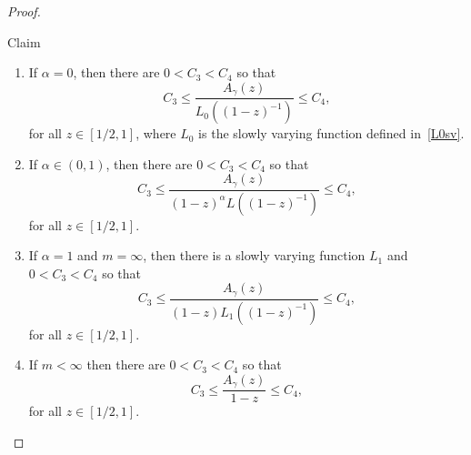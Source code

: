 \documentclass[11pt]{article}
\theoremstyle{definition}
\newenvironment{enonce*}[2][]{\par\medskip\noindent\textbf{#2.}\itshape}{\par\medskip}
\numberwithin{equation}{section}
\numberwithin{figure}{section}
\numberwithin{table}{section}
\newcommand{\ga}{\alpha}
\newcommand{\gga}{\gamma}
\newcommand*{\alphenumi}{\renewcommand*{\theenumi}{\alph{enumi}}}
\begin{document}
\begin{proof}
\begin{enonce*}{Claim} 
\begin{enumerate}\alphenumi
\item \label{c1} If $\ga = 0$, then there are $0 < C_3 < C_4$ so that
\begin{equation}\label{claim_a_zero}
C_3 \leq \frac{A_\gga(z)}{L_0((1 - z)^{-1})} \leq C_4,
\end{equation}
for all $z \in [1/2,1]$, where $L_0$ is the slowly varying function defined in~\eqref{L0sv}.
\item \label{c2} If $\ga \in (0,1)$, then there are $0 < C_3 < C_4$ so that
\begin{equation}
C_3 \leq \frac{A_\gga(z)}{(1 - z)^\ga L((1 - z)^{-1})} \leq C_4,
\end{equation}
for all $z \in [1/2,1]$.
\item \label{c3} If $\ga = 1$ and $m = \infty$, then there is a slowly varying function $L_1$ and $0 < C_3 < C_4$ so that
\begin{equation}
C_3 \leq \frac{A_\gga(z)}{(1 - z) L_1((1 - z)^{-1})} \leq C_4,
\end{equation}
for all $z \in [1/2,1]$.
\item \label{c4} If $m < \infty$ then there are $0 < C_3 < C_4$ so that
\begin{equation}
C_3 \leq \frac{A_\gga(z)}{1 - z} \leq C_4,
\end{equation}
for all $z\in[1/2, 1]$.
\end{enumerate}
\end{enonce*}


\end{proof}
\end{document}
